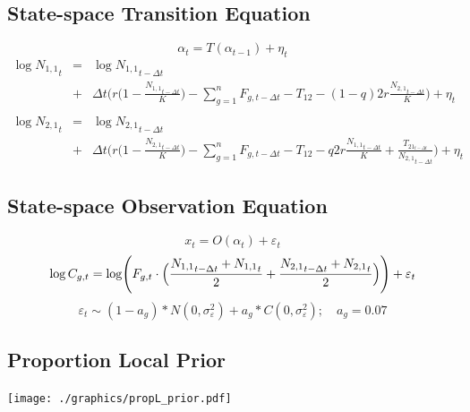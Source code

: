 \documentclass[a4paper,KOMA,landscape,titlepage]{powersem}
\newcommand\None{{N_{1,1}}}
\newcommand\Ntwo{{N_{2,1}}}
\begin{document}
\begin{slide}\section{State-space Transition Equation}
\begin{center}
\begin{equation}
\alpha_t=T(\alpha_{t-1}) + \eta_t
\end{equation}
\vspace{2ex}
\begin{eqnarray}
\label{eqn:finitecoupledlogschaefer}
\log \None_t &=& \log \None_{t-\Delta t}\nonumber\\ 
             &+&\Delta t\bigg(r\Big(1-\frac{\None_{t-\Delta t}}{K}\Big)
-\sum_{g=1}^n F_{g,t-\Delta t} - T_{12} - (1-q)2r\frac{\Ntwo_{t-\Delta
t}}{K}\bigg)+\eta_t\nonumber\\
\\ \log \Ntwo_t &=& \log \Ntwo_{t-\Delta t}\nonumber\\
             &+&\Delta t\bigg(r\Big(1-\frac{\Ntwo_{t-\Delta t}}{K}\Big)
-\sum_{g=1}^n F_{g,t-\Delta t} - T_{12} - q2r\frac{\None_{t-\Delta t}}{K}
     +\frac{T_{{21}_{t-\Delta t}}}{\Ntwo_{t-\Delta t}}\bigg)+\eta_t\nonumber
\end{eqnarray}
\end{center}
\end{slide}

\begin{slide}\section{State-space Observation Equation}
\begin{center}
\begin{equation}
x_t = O(\alpha_t) + \varepsilon_t
\end{equation}
\vspace{2ex}
\begin{equation}
\log C_{g,t} = \log \Biggl(F_{g,t}\cdot\Bigl(\frac{\None_{t-\Delta t}+\None_t}{2}
                           +\frac{\Ntwo_{t-\Delta
t}+\Ntwo_t}{2}\Bigr)\Biggr) + \varepsilon_t
\label{eqn:obs}
\end{equation}
\begin{equation}
\varepsilon_t \sim
(1-a_g)*N(0,\sigma^2_\varepsilon)+a_g*C(0,\sigma^2_\varepsilon);\quad a_g =
0.07
\end{equation}
\end{center}
\end{slide}

\begin{slide}\section{Proportion Local Prior}
\begin{center}
\texttt{[image: ./graphics/propL\_prior.pdf]}
\end{center}
\end{slide}
\end{document}
